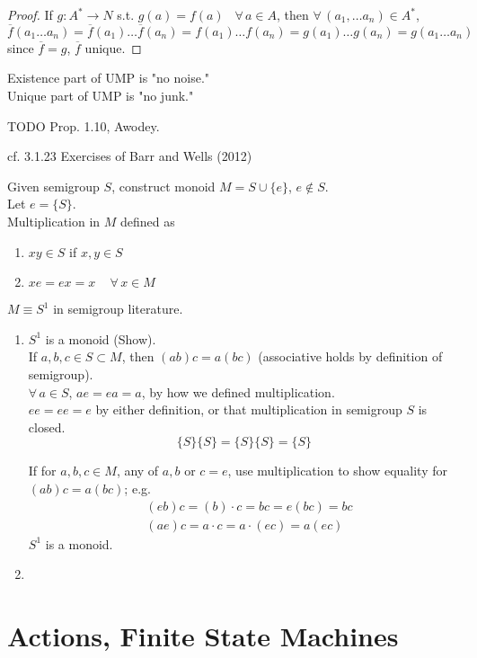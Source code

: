\documentclass[10pt]{amsart}
\newcommand{\exercisehead}[1]
  { \smallskip
   \noindent{\small\bf Exercise #1.}
  }
\begin{document}
\begin{multicols*}{2}
\begin{proof}
	If $g: A^* \to N$ s.t. $g(a) =f(a)$ \quad \, $\forall \, a \in A$, then $\forall \, (a_1, \dots a_n) \in A^*$, 
	\[
	\overline{f}(a_1 \dots a_n) = \overline{f}(a_1) \dots \overline{f}(a_n) = f(a_1) \dots f(a_n) = g(a_1) \dots g(a_n) = g(a_1 \dots a_n)
	\]
	since $\overline{f} = g$, $\overline{f}$ unique.
\end{proof} 

Existence part of UMP is "no noise." \\
Unique part of UMP is "no junk."

TODO Prop. 1.10, Awodey.






\exercisehead{1} cf. 3.1.23 Exercises of Barr and Wells (2012) \cite{BaWe2012}

Given semigroup $S$, construct monoid $M = S \cup \lbrace e \rbrace$, $e\notin S$. \\
Let $e=\lbrace S \rbrace$. \\
Multiplication in $M$ defined as 
\begin{enumerate}
	\item $xy \in S$ if $x,y \in S$ 
	\item $xe=ex = x \quad \, \forall \, x \in M$
\end{enumerate}
$M \equiv S^1$ in semigroup literature.

\begin{enumerate}
	\item $S^1$ is a monoid (Show). \\
	If $a,b,c \in S \subset M$, then $(ab)c = a(bc)$ (associative holds by definition of semigroup). \\
	$\forall \, a \in S$, $ae = ea =a$, by how we defined multiplication. \\
	$ee = ee =e $ by either definition, or that multiplication in semigroup $S$ is closed.
	\[
	\lbrace S \rbrace \lbrace S \rbrace = \lbrace S \rbrace \lbrace S \rbrace = \lbrace S \rbrace
	\]
	
	If for $a,b,c \in M$, any of $a,b$ or $c=e$, use multiplication to show equality for $(ab)c = a(bc)$; e.g.
	\[
	\begin{aligned}
	& (eb) c = (b)\cdot c = bc = e(bc) = bc \\ 
	& (ae) c = a\cdot c =a \cdot (ec) = a(ec)
	\end{aligned}
	\]
	$S^1$ is a monoid.
	\item 
\end{enumerate}

\section{Actions, Finite State Machines}


\end{multicols*}
\end{document}

